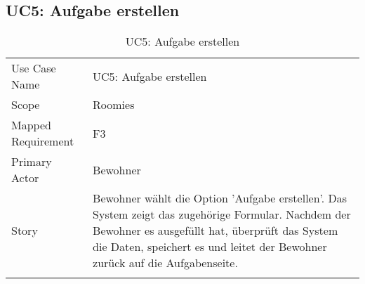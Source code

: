 \subsection{UC5: Aufgabe erstellen}
\begin{table}[H]
	\tablestyle
	\tablealtcolored
	\begin{tabularx}{\textwidth}{lX}
		\tablebody
			Use Case Name &
			UC5: Aufgabe erstellen
			\tabularnewline
			Scope &
			Roomies
			\tabularnewline
			Mapped Requirement &
			F3
			\tabularnewline
			Primary Actor &
			Bewohner
			\tabularnewline
			Story &
			Bewohner wählt die Option 'Aufgabe erstellen'. Das System zeigt das zugehörige Formular. Nachdem der Bewohner es ausgefüllt hat, überprüft das System die Daten, speichert es und leitet der Bewohner zurück auf die Aufgabenseite.
			\tabularnewline
		\tableend
	\end{tabularx}
	\caption{UC5: Aufgabe erstellen}
\end{table}


